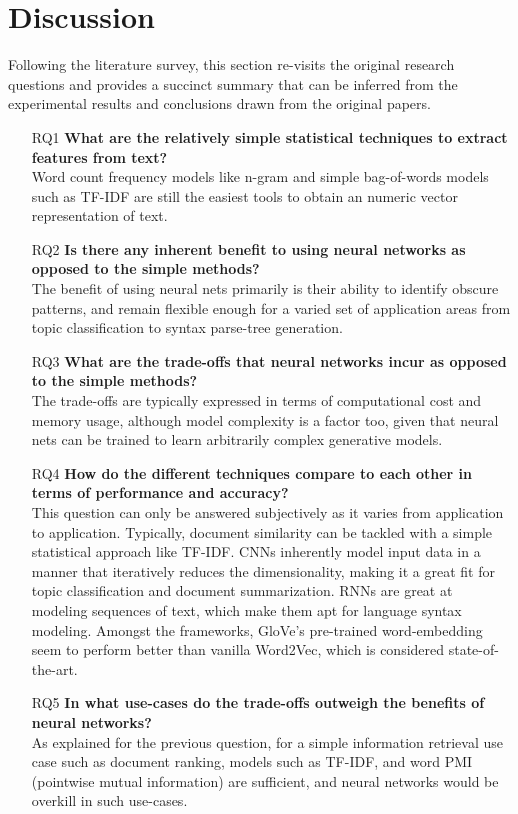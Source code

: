 \documentclass[11pt,a4paper]{article}
\begin{document}


\section{Discussion} %
\label{sec:discussion}

  Following the literature survey, this section re-visits the original research questions and provides a succinct summary that can be inferred from the experimental results and conclusions drawn from the original papers.\\

  \begin{itemize}
    \item [RQ1]
    \textbf{What are the relatively simple statistical techniques to extract features from text?} \\
    Word count frequency models like n-gram and simple bag-of-words models such as TF-IDF are still the easiest tools to obtain an numeric vector representation of text.
    \item [RQ2]
    \textbf{Is there any inherent benefit to using neural networks as opposed to the simple methods?} \\
    The benefit of using neural nets primarily is their ability to identify obscure patterns, and remain flexible enough for a varied set of application areas from topic classification to syntax parse-tree generation.
    \item [RQ3]
    \textbf{What are the trade-offs that neural networks incur as opposed to the simple methods?} \\
    The trade-offs are typically expressed in terms of computational cost and memory usage, although model complexity is a factor too, given that neural nets can be trained to learn arbitrarily complex generative models.
    \item [RQ4]
    \textbf{How do the different techniques compare to each other in terms of performance and accuracy?} \\
    This question can only be answered subjectively as it varies from application to application. Typically, document similarity can be tackled with a simple statistical approach like TF-IDF. CNNs inherently model input data in a manner that iteratively reduces the dimensionality, making it a great fit for topic classification and document summarization. RNNs are great at modeling sequences of text, which make them apt for language syntax modeling. Amongst the frameworks, GloVe's pre-trained word-embedding seem to perform better than vanilla Word2Vec, which is considered state-of-the-art.
    \item [RQ5]
    \textbf{In what use-cases do the trade-offs outweigh the benefits of neural networks?} \\
    As explained for the previous question, for a simple information retrieval use case such as document ranking, models such as TF-IDF, and word PMI (pointwise mutual information) are sufficient, and neural networks would be overkill in such use-cases.
  \end{itemize}
\end{document}
